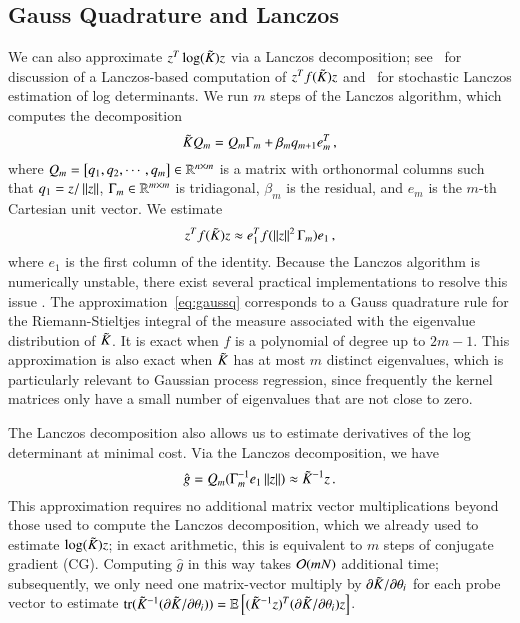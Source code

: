 \subsection{Gauss Quadrature and Lanczos}\label{sgpsec:lan}

We can also approximate $z^T \log(\tilde{K}_{}) z$ via a Lanczos decomposition; see~
\cite{golub2010matrices} for discussion of a Lanczos\hyp{}based computation of
$z^T f(\tilde{K}_{}) z$ and~\cite{ubarufast,bai1998computing} for stochastic Lanczos
estimation of log determinants.  We run $m$ steps of the Lanczos algorithm,
which computes the decomposition
\begin{equation}\label{eqn:Klanczos}
  \tilde{K}_{} Q_m = Q_m\Gamma_m+ \beta_m q_{m+1} e_m^T\,,
\end{equation}
where $Q_m = \left[q_1, q_2, \cdots, q_m\right] \in \mathbb{R}^{n \times m}$ is a
matrix with orthonormal columns such that $q_1 = z/\left\lVert z\right\rVert$, $\Gamma_m \in
\mathbb{R}^{m \times m}$ is tridiagonal, $\beta_m$ is the residual, and $e_m$ is the
$m$-th Cartesian unit vector.  We estimate
\begin{equation} \label{eq:gaussq}
  z^T f(\tilde{K}_{}) z \approx e_1^T f(\left\lVert z\right\rVert^2 \Gamma_m) e_1\,,
\end{equation}
where $e_1$ is the first column of the identity. Because the Lanczos algorithm
is numerically unstable, there exist several practical implementations to
resolve this issue \cite{cullum2002lanczos,saad1992numerical}. The
approximation~\eqref{eq:gaussq} corresponds to a Gauss quadrature rule for the
Riemann\hyp{}Stieltjes integral of the measure associated with the eigenvalue
distribution of $\tilde{K}_{}$.  It is exact when $f$ is a polynomial of degree up
to $2m-1$.  This approximation is also exact when $\tilde{K}_{}$ has at most $m$
distinct eigenvalues, which is particularly relevant to Gaussian process
regression, since frequently the kernel matrices only have a small
number of eigenvalues that are not close to zero.

The Lanczos decomposition also allows us to estimate derivatives of the log
determinant at minimal cost. Via the Lanczos decomposition, we have
\begin{equation}\label{eqn:lansolve}
  \hat{g} = Q_m (\Gamma_m^{-1} e_1 \left\lVert z\right\rVert) \approx \tilde{K}_{}^{-1}z \,.
\end{equation}
This approximation requires no additional matrix vector multiplications beyond
those used to compute the Lanczos decomposition, which we already used to
estimate $\log(\tilde{K}_{}) z$; in exact arithmetic, this is equivalent to $m$ steps
of conjugate gradient (CG). Computing $\hat{g}$ in this way takes $\mathcal{O}(mN)$
additional time; subsequently, we only need one matrix-vector multiply by
$\partial \tilde{K}_{} / \partial \theta_i$ for each probe vector to estimate $\operatorname{tr}
(\tilde{K}_{}^{-1} (\partial \tilde{K}_{} / \partial \theta_i)) = \operatorname{\mathbb{E}}\left[(\tilde{K}_{}^{-1}
z)^T(\partial \tilde{K}_{}/\partial \theta_i) z\right]$.


